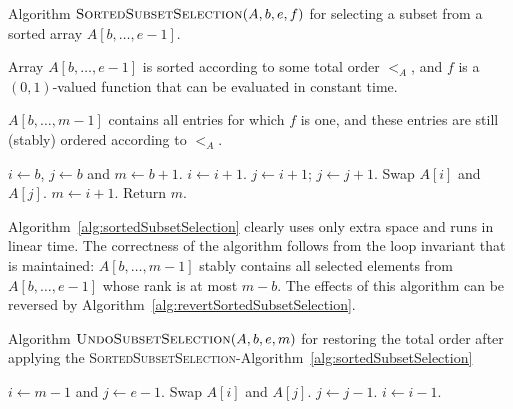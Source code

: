 \begin{algorithm}
  \caption{Algorithm
    $\textsc{SortedSubsetSelection}(A,b,e,f)$ for selecting a
    subset from a sorted array $A[b,\ldots, e-1]$.} 
  \label{alg:sortedSubsetSelection}
  \begin{algorithmic}[1]
    \REQUIRE Array $A[b,\ldots, e-1]$ is sorted according to
    some total order $<_{A}$, and $f$ is a 
    $(0,1)$-valued function that can be evaluated in constant
    time.
    
    \ENSURE $A[b,\ldots, m-1]$ contains all entries for which
    $f$ is one, and these entries are still (stably) ordered
    according to $<_{A}$.

    \STATE $i\gets b$, $j\gets b$ and $m\gets b+1$. 
        \STATE $i\gets i+1$.  
      \ENDWHILE
      \STATE $j\gets i+1$;
        \STATE $j\gets j+1$.  
      \ENDWHILE
        \STATE Swap $A[i]$ and $A[j]$.
        \STATE $m\gets i+1$. 
      \ENDIF
    \ENDWHILE
    \STATE Return $m$.
  \end{algorithmic}
\end{algorithm}

Algorithm~\ref{alg:sortedSubsetSelection} clearly uses only 
extra space and runs in linear time. The correctness of the algorithm
follows from the loop invariant that is maintained: $A[b,\ldots, m-1]$
stably contains all selected elements from $A[b,\ldots, e-1]$ whose rank
is at most $m-b$.  The effects of this algorithm can be reversed by
Algorithm~\ref{alg:revertSortedSubsetSelection}.

\begin{algorithm}
  \caption{Algorithm $\textsc{UndoSubsetSelection}(A,b,e,m)$
    for restoring the total order after applying the 
    \textsc{SortedSubsetSelection}-Algorithm~\ref{alg:sortedSubsetSelection}}
  \label{alg:revertSortedSubsetSelection}
  \begin{algorithmic}[1]

    \STATE $i\gets m-1$ and $j\gets e-1$.
        \STATE Swap $A[i]$ and $A[j]$.
        \STATE $j\gets j-1$.
      \ENDIF
      \STATE $i\gets i-1$.
    \ENDWHILE

  \end{algorithmic}
\end{algorithm}

